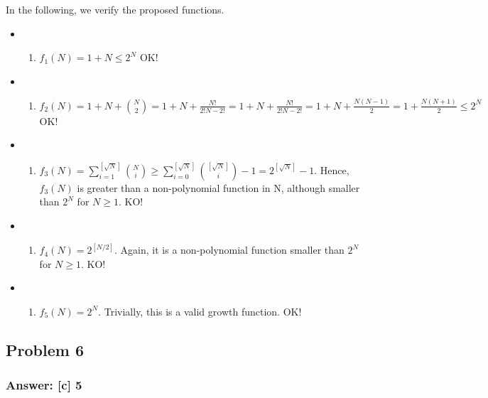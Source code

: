 \documentclass[11pt]{article}
\providecommand{\tightlist}{%
      \setlength{\itemsep}{0pt}\setlength{\parskip}{0pt}}
\begin{document}
In the following, we verify the proposed functions.

\begin{itemize}
\item
  \begin{enumerate}
  \def\labelenumi{\roman{enumi})}
  \tightlist
  \item
    \(f_1(N)=1+N \le 2^N\) OK!
  \end{enumerate}
\item
  \begin{enumerate}
  \def\labelenumi{\roman{enumi})}
  \setcounter{enumi}{1}
  \tightlist
  \item
    \(f_2(N)=1+N+{N\choose 2}=1+N+\frac{N!}{2!N-2!}=1+N+\frac{N!}{2!N-2!}=1+N+\frac{N(N-1)}{2}=1+\frac{N(N+1)}{2}\le 2^N\)
    OK!
  \end{enumerate}
\item
  \begin{enumerate}
  \def\labelenumi{\roman{enumi})}
  \setcounter{enumi}{2}
  \tightlist
  \item
    \(f_3(N)=\sum^{[\sqrt{N}]}_{i=1} {N\choose i} \ge \sum^{[\sqrt{N}]}_{i=0}{[\sqrt{N}]\choose i}-1=2^{[\sqrt{N}]}-1\).
    Hence, \(f_3(N)\) is greater than a non-polynomial function in N,
    although smaller than \(2^N\) for \(N\ge 1\). KO!
  \end{enumerate}
\item
  \begin{enumerate}
  \def\labelenumi{\roman{enumi})}
  \setcounter{enumi}{3}
  \tightlist
  \item
    \(f_4(N)=2^{[N/2]}\). Again, it is a non-polynomial function smaller
    than \(2^N\) for \(N\ge 1\). KO!
  \end{enumerate}
\item
  \begin{enumerate}
  \def\labelenumi{\alph{enumi})}
  \setcounter{enumi}{21}
  \tightlist
  \item
    \(f_5(N)=2^{N}\). Trivially, this is a valid growth function. OK!
  \end{enumerate}
\end{itemize}

    \hypertarget{problem-6}{%
\subsection{Problem 6}\label{problem-6}}

\hypertarget{answer-c-5}{%
\subsubsection{Answer: {[}c{]} 5}\label{answer-c-5}}
\end{document}
